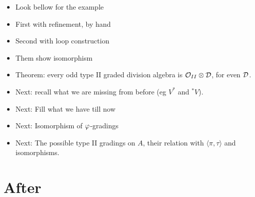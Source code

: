 \documentclass{amsbook}
\begin{document}
\begin{itemize}
        \item Look bellow for the example
        
        \item First with refinement, by hand
        
        \item Second with loop construction
        
        \item Them show isomorphism
        
        \item Theorem: every odd type II graded division algebra is $\mathcal O_{II} \otimes \mathcal{D}$, for even $\mathcal{D}$.
        
        \item Next: recall what we are missing from before (eg $V^*$ and $^* V$).
        
        \item Next: Fill what we have till now
        
        \item Next: Isomorphism of $\varphi$-gradings
        
        \item Next: The possible type II gradings on $A$, their relation with $\langle \pi, \tau\rangle$ and isomorphisms.
        
    \end{itemize}

\section{After}


    
    
    
    
    
\end{document}
